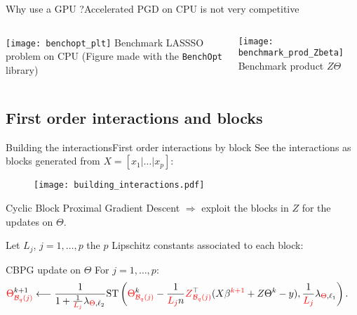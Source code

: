 \documentclass[10pt,aspectratio=43]{beamer}
\begin{document}
\begin{frame}[fragile]{Why use a GPU ?}{Accelerated PGD on CPU is not very competitive}
    \begin{columns}
        \begin{column}{0.55\textwidth}
            \centering
            \texttt{[image: benchopt\_plt]}
           \hfill Benchmark LASSSO problem on CPU (Figure made with
           the \texttt{BenchOpt} library)
        \end{column}
        \begin{column}{0.55\textwidth}
            \centering
            \texttt{[image: benchmark\_prod\_Zbeta]}
            \hfill Benchmark product $Z\Theta$
        \end{column}
    \end{columns}
    \medskip
{}
\end{frame}

\subsection{First order interactions and blocks}
\begin{frame}{Building the interactions}{First order interactions by block}
See the interactions as blocks generated from $X=[x_1|\dots|x_p]$:
\begin{figure}[h]
    \centering
    \texttt{[image: building\_interactions.pdf]}
\end{figure}
\end{frame}

\begin{frame}{Cyclic Block Proximal Gradient Descent}
$\Longrightarrow$ exploit the blocks in $Z$ for the updates on $\Theta$.

Let $L_j$, $j=1,\dots,p$ the $p$ Lipschitz constants associated to each block:

\begin{block}{CBPG update on $\Theta$}
For $j=1,\dots,p$:
\begin{align*}
\textcolor{red}{\Theta}_{\textcolor{red}{\mathcal{B}_{q}(j)}}^{k+1} & \longleftarrow \frac{1}{1 +
\frac{1}{\textcolor{red}{L_j}} \lambda_{\textcolor{red}{\Theta}, \ell_2}}
\mathrm{ST}
\left( \textcolor{red}{\Theta}_{\textcolor{red}{\mathcal{B}_{q}(j)}}^k - \frac{1}{\textcolor{red}{L_j} n}
\textcolor{red}{Z}_{\textcolor{red}{\mathcal{B}_{q}(j)}}^\top (X\beta^{\textcolor{red}{k+1}} + Z\Theta^k - y),
\frac{1}{\textcolor{red}{L_j}}\lambda_{\textcolor{red}{\Theta}, \ell_1}
\right).
\end{align*}
\end{block}
\end{frame}
\end{document}
